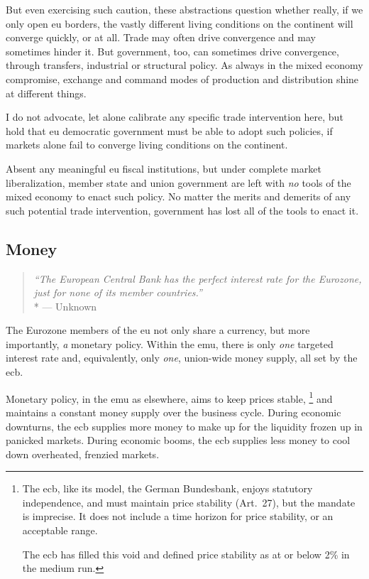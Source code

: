 But even exercising such caution, these abstractions question whether really, if we only open \gls{eu} borders, the vastly different living conditions on the continent will converge quickly, or at all.
Trade may often drive convergence and may sometimes hinder it.
But government, too, can sometimes drive convergence, through transfers, industrial or structural policy.
As always in the mixed economy compromise, exchange and command modes of production and distribution shine at different things.

I do not advocate, let alone calibrate any specific trade intervention here, but hold that \gls{eu} democratic government must be able to adopt such policies, if markets alone fail to converge living conditions on the continent.

Absent any meaningful \gls{eu} fiscal institutions, but under complete market liberalization, member state and union government are left with \emph{no} tools of the mixed economy to enact such policy.
No matter the merits and demerits of any such potential trade intervention, government has lost all of the tools to enact it.

\subsection{Money}

\begin{quote}
	\emph{``The European Central Bank has the perfect interest rate for the Eurozone, just for none of its member countries.''}
	\\*
	--- Unknown
\end{quote}

The Eurozone members of the \gls{eu} not only share a currency, but more importantly, \emph{a} monetary policy.
Within the \gls{emu}, there is only \emph{one} targeted interest rate and, equivalently, only \emph{one}, union-wide money supply, all set by the \gls{ecb}.

Monetary policy, in the \gls{emu} as elsewhere, aims to keep prices stable,
\footnote{
	The \gls{ecb}, like its model, the German Bundesbank, enjoys statutory independence, and must maintain price stability (Art.~27), but the mandate is imprecise.
	It does not include a time horizon for price stability, or an acceptable range.

	The \gls{ecb} has filled this void and defined price stability as at or below 2\% in the medium run.
}
and maintains a constant money supply over the business cycle.
During economic downturns, the \gls{ecb} supplies more money to make up for the liquidity frozen up in panicked markets.
During economic booms, the \gls{ecb} supplies less money to cool down overheated, frenzied markets.

